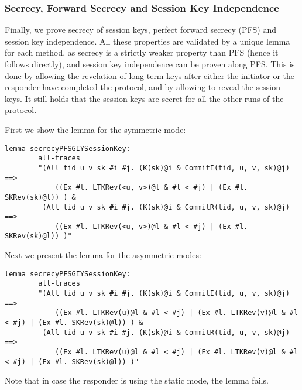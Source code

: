 \subsubsection{Secrecy, Forward Secrecy and Session Key Independence}

Finally, we prove secrecy of session keys, perfect forward secrecy
(PFS) and session key independence. 
%
All these properties are validated by a unique lemma for each method,
as secrecy is a strictly weaker property than PFS (hence it follows
directly), and session key independence can be proven along PFS.
%
This is done by allowing the revelation of long term keys after either
the initiator or the responder have completed the protocol, and by
allowing to reveal the session keys.
%
It still holds that the session keys are secret for all the other runs
of the protocol.

First we show the lemma for the symmetric mode:
\begin{lstlisting}
lemma secrecyPFSGIYSessionKey:
        all-traces
        "(All tid u v sk #i #j. (K(sk)@i & CommitI(tid, u, v, sk)@j) ==>
            ((Ex #l. LTKRev(<u, v>)@l & #l < #j) | (Ex #l. SKRev(sk)@l)) ) &
         (All tid u v sk #i #j. (K(sk)@i & CommitR(tid, u, v, sk)@j) ==>
            ((Ex #l. LTKRev(<u, v>)@l & #l < #j) | (Ex #l. SKRev(sk)@l)) )"
\end{lstlisting}

Next we present the lemma for the asymmetric modes:
\begin{lstlisting}
lemma secrecyPFSGIYSessionKey:
        all-traces
        "(All tid u v sk #i #j. (K(sk)@i & CommitI(tid, u, v, sk)@j) ==>
            ((Ex #l. LTKRev(u)@l & #l < #j) | (Ex #l. LTKRev(v)@l & #l < #j) | (Ex #l. SKRev(sk)@l)) ) &
         (All tid u v sk #i #j. (K(sk)@i & CommitR(tid, u, v, sk)@j) ==>
            ((Ex #l. LTKRev(u)@l & #l < #j) | (Ex #l. LTKRev(v)@l & #l < #j) | (Ex #l. SKRev(sk)@l)) )"
\end{lstlisting}

Note that in case the responder is using the static mode, the lemma
fails.  


